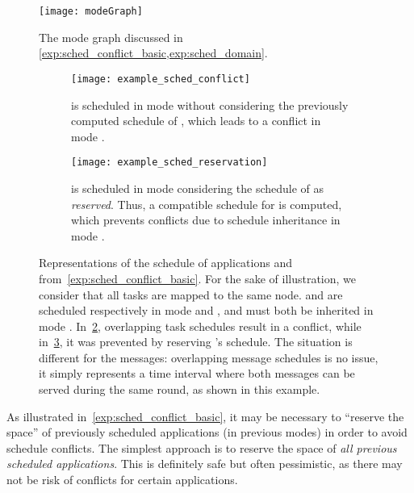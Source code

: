 \begin{figure}
\centering
\texttt{[image: modeGraph]}
\caption{The mode graph \modeGraph discussed in \cref{exp:sched_conflict_basic,exp:sched_domain}.
}
\label{fig:modeGraph}
\end{figure}

\begin{figure}
	\begin{subfigure}[t]{.48\linewidth}
		\texttt{[image: example\_sched\_conflict]}
		\caption{%
		 is scheduled in mode  without considering the previously computed schedule of , which leads to a conflict in mode .}
		\label{subfig:example_sched_conflict}
	\end{subfigure}%
	\hfill
	\begin{subfigure}[t]{.48\linewidth}
		\texttt{[image: example\_sched\_reservation]}
		\caption{%
		 is scheduled in mode  considering the schedule of  as \emph{reserved}. Thus, a compatible schedule for  is computed, which prevents conflicts due to schedule inheritance in mode .}
		\label{subfig:example_sched_reservation}
	\end{subfigure}
	\caption{%
		Representations of the schedule of applications  and  from~\cref{exp:sched_conflict_basic}.
		For the sake of illustration, we consider that all tasks are mapped to the same node.
		 and  are scheduled respectively in mode  and , and must both be inherited in mode .
		In~\cref{subfig:example_sched_conflict}, overlapping task schedules result in a conflict, while in~\cref{subfig:example_sched_reservation}, it was prevented by reserving 's schedule.
		The situation is different for the messages: overlapping message schedules is no issue, it simply represents a time interval where both messages can be served during the same round, as shown in this example.
	}
	\label{fig:example_sched}
\end{figure}

As illustrated in~\cref{exp:sched_conflict_basic}, it may be necessary to ``reserve the space'' of previously scheduled applications (\ie in previous modes) in order to avoid schedule conflicts.
The simplest approach is to reserve the space of \emph{all previous scheduled applications}. This is definitely safe but often pessimistic, as there may not be risk of conflicts for certain applications.

